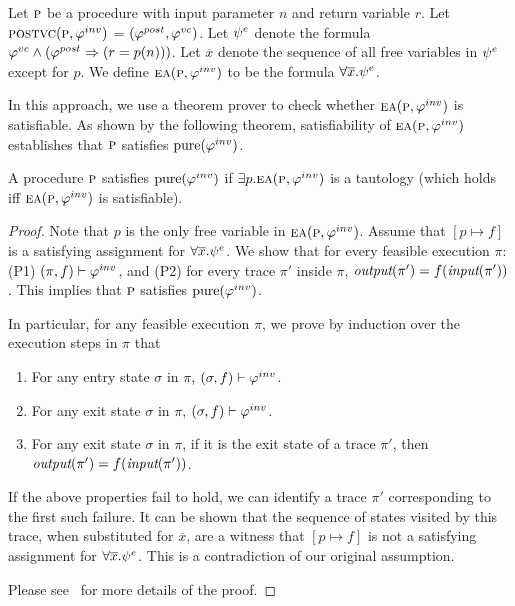 Let $\textsc{p}$ be a procedure with input parameter $n$ and return variable $r$.
Let\\ $\textsc{postvc}({\textsc{p}},{\varphi^{inv}})$ = $(\varphi^{post},\varphi^{vc})$.
Let $\psi^e$ denote the formula $\varphi^{vc} \wedge (\varphi^{post} \Rightarrow (r = p(n)))$.
Let $\overline{x}$ denote the sequence of all free variables in $\psi^e$ except for $p$.
We define $\textsc{ea}(\textsc{p},\varphi^{inv})$ to be the formula $ \forall \overline{x}. \psi^e$.

In this approach, we use a theorem prover to check whether $\textsc{ea}(\textsc{p},\varphi^{inv})$ is satisfiable.
As shown by the following theorem, satisfiability of $\textsc{ea}(\textsc{p},\varphi^{inv})$ establishes that $\textsc{p}$
satisfies $\mathrm{pure}(\varphi^{inv})$.

\begin{theorem}
\label{theorem:EA}
A procedure $\textsc{p}$ satisfies $\mathrm{pure}(\varphi^{inv})$ if
$\exists p. \textsc{ea}(\textsc{p},\varphi^{inv})$ is a tautology
(which holds iff $\textsc{ea}(\textsc{p},\varphi^{inv})$ is satisfiable).
\end{theorem}

\begin{proof}

Note that $p$ is the only free variable in $\textsc{ea}(\textsc{p},\varphi^{inv})$. Assume that $[p \mapsto f]$ is a
satisfying assignment
for  $ \forall \overline{x}. \psi^e$.
We show that for every feasible execution $\pi$: (P1) $(\pi, f)
\vdash \varphi^{inv}$, and (P2) for every trace $\pi'$ inside $\pi$,
$\textit{output}(\pi') = f(\textit{input}(\pi'))$. This implies that
$\textsc{p}$ satisfies $\mathrm{pure}(\varphi^{inv})$.

In particular, for any feasible execution $\pi$, we prove by induction over the
execution steps in $\pi$ that
\begin{enumerate}
\item For any entry state $\sigma$ in $\pi$, $(\sigma,f) \vdash \varphi^{inv}$.
\item For any exit state $\sigma$ in $\pi$, $(\sigma,f) \vdash \varphi^{inv}$.
\item For any exit state $\sigma$ in $\pi$, if it is the exit state of a trace $\pi'$,
then $\textit{output}(\pi') = f(\textit{input}(\pi'))$.
\end{enumerate}

If the above properties fail to hold, we can identify a trace $\pi'$ corresponding
to the first such failure. It can be shown that the sequence of
states visited by this trace, when substituted for $\overline{x}$, are a
witness that $[p \mapsto f]$ is not a satisfying assignment for  $\forall
\overline{x}. \psi^e$. This is a contradiction of our original
assumption. 


Please see~\cite{CheckingOP:arxiv} for more details of the proof.

\end{proof}

